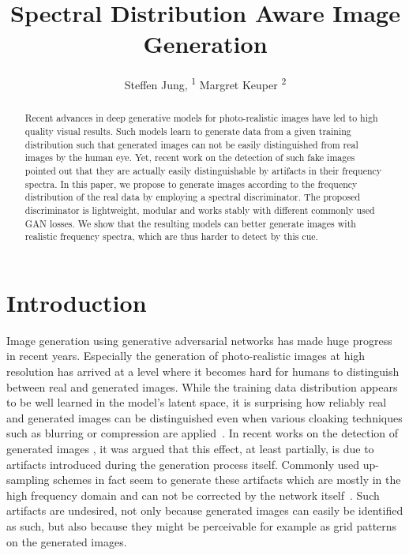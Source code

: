 \documentclass[letterpaper]{article} %
\title{Spectral Distribution Aware Image Generation}
\author{
    Steffen Jung, \textsuperscript{\rm 1}
    Margret Keuper \textsuperscript{\rm 2}
    \\
}
\begin{document}
\maketitle              %
\begin{abstract}
Recent advances in deep generative models for photo-realistic images have led to high quality visual results. Such models learn to generate data from a given training distribution such that generated images can not be easily distinguished from real images by the human eye. Yet, recent work on the detection of such fake images pointed out that they are actually easily distinguishable by artifacts in their frequency spectra. In this paper, we propose to generate images according to the frequency distribution of the real data by employing a spectral discriminator. The proposed discriminator is lightweight, modular and works stably with different commonly used GAN losses. We show that the resulting models can better generate images with realistic frequency spectra, which are thus harder to detect by this cue.

\end{abstract}
\section{Introduction}
Image generation using generative adversarial networks has made huge progress in recent years. Especially the generation of photo-realistic images at high resolution has arrived at a level where it becomes hard for humans to distinguish between real and generated images. While the training data distribution appears to be well learned in the model's latent space, it is surprising how reliably real and generated images can be distinguished even when various cloaking techniques such as blurring or compression are applied~\cite{cispa2965}. In recent works on the detection of generated images \cite{frank2020leveraging,margret2020upconvolution}, it was argued that this effect, at least partially, is due to artifacts introduced during the generation process itself. Commonly used up-sampling schemes in fact seem to generate these artifacts which are mostly in the high frequency domain and can not be corrected by the network itself~\cite{frank2020leveraging,margret2020upconvolution,bai2020fake}. %
Such artifacts are undesired, not only because generated images can easily be identified as such, but also because they might be perceivable for example as grid patterns on the generated images.
\end{document}

